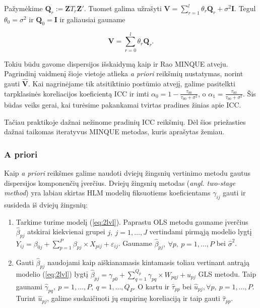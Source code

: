 \documentclass[12pt,a4paper]{article}
\begin{document}
Pažymėkime $\mathbf{Q}_r:= \mathbf{Z}T_r\mathbf{Z'}$. Tuomet galima užrašyti $\mathbf{V}=\sum^l_{r=1}\theta_r\mathbf{Q}_r+\sigma^2 \mathbf{I}$. Tegul $\theta_0 = \sigma^2$ ir $\mathbf{Q}_0=\mathbf{I}$ ir galiausiai gauname

\begin{equation}
\mathbf{V}=\sum^l_{r=0} \theta_r\mathbf{Q}_r.
\end{equation}

Tokiu būdu gavome dispersijos išskaidymą kaip ir Rao MINQUE atveju. Pagrindinį vaidmenį šioje vietoje atlieka \textit{a priori} reikšmių nustatymas, norint gauti $\mathbf{\hat{V}}$. Kai nagrinėjame tik atsitiktinio postūmio atvejį, galime pasitelkti tarpklasinės koreliacijos koeficientą ICC ir imti $\alpha_0=1-\frac{\tau_{00}}{\tau_{00}+\sigma^2}$, o $\alpha_1=\frac{\tau_{00}}{\tau_{00}+\sigma^2}$. Šis būdas veiks gerai, kai turėsime pakankamai tvirtas pradines žinias apie ICC.\cite{delpish}

Tačiau praktikoje dažnai nežinome pradinių ICC reikšmių. Dėl šios priežasties dažnai taikomas iteratyvus MINQUE metodas, kuris aprašytas žemiau.


\subsubsection{A priori}
Kaip \textit{a priori} reikšmes galime naudoti dviejų žingsnių vertinimo metodu gautus dispersijos komponenčių įverčius. Dviejų žingsnių metodas (\textit{angl. two-stage method}) yra labiau skirtas HLM modelių fiksuotiems koeficientams $\gamma_{ij}$ gauti ir susideda iš dviejų žingsnių:
\begin{enumerate}
\item Tarkime turime modelį (\ref{eq:2lvl}). Paprastu OLS metodu gauname įverčius $\hat{\beta}_{pj}$ atskirai kiekvienai grupei $j,\ j=1,\dots,J$ vertindami pirmąją modelio lygtį $Y_{ij} = \beta_{0j}+\sum^P_{p = 1} \beta_{pj}\times X_{pij}+\varepsilon_{ij}$. Gauname $\hat{\beta}_{pj}, \ \forall p,\ p=1,\dots,P$ bei $\hat{\sigma}^2$.
\item Gauti $\hat{\beta}_{pj}$ naudojami kaip aiškianamasis kintamasis toliau vertinant antrąją modelio (\ref{eq:2lvl}) lygtį $\hat{\beta}_{pj} = \gamma_{p0} + \sum^{Q_p}_{q=1}\gamma_{pq}\times W_{pqj}+u_{pj}$ GLS metodu. Taip gaunami $\hat{\gamma}_{pq}, \ p=1,\dots,P,\  q=1,\dots,Q_P$. O kartu ir $\hat{\tau}_{pp}$ bei $\hat{u}_{pj}, \forall p,\ p=1,\dots,P$. Turint $\hat{u}_{pj}$, galime suskaičiuoti jų empirinę koreliaciją ir taip gauti $\hat{\tau}_{pp}$.
\end{enumerate}
\end{document}

